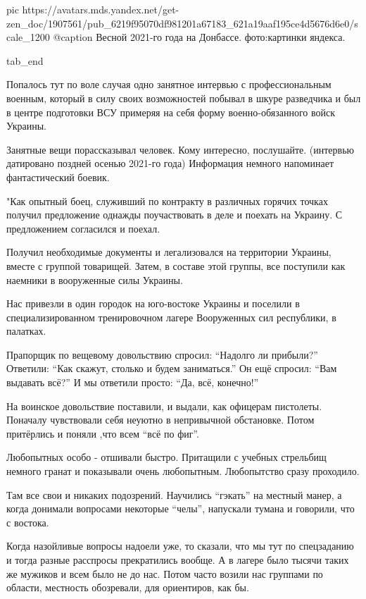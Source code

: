 		 pic https://avatars.mds.yandex.net/get-zen_doc/1907561/pub_6219f95070df981201a67183_621a19aaf195ce4d5676d6e0/scale_1200
		 @caption Весной 2021-го года на Донбассе. фото:картинки яндекса.

  tab_end
\fi

Попалось тут по воле случая одно занятное интервью с профессиональным военным,
который в силу своих возможностей побывал в шкуре разведчика и был в центре
подготовки ВСУ примеряя на себя форму военно-обязанного войск Украины.

Занятные вещи порассказывал человек. Кому интересно, послушайте. (интервью
датировано поздней осенью 2021-го года) Информация немного напоминает
фантастический боевик.

\begin{zznagolos}
"Как опытный боец, служивший по контракту в различных горячих точках получил
предложение однажды поучаствовать в деле и поехать на Украину. С предложением
согласился и поехал. 

Получил необходимые документы и легализовался на территории Украины, вместе
с группой товарищей. Затем, в составе этой группы, все поступили как
наемники в вооруженные силы Украины.	
\end{zznagolos}

Нас привезли в один городок на юго-востоке Украины и поселили в
специализированном тренировочном лагере Вооруженных сил республики, в палатках.

Прапорщик по вещевому довольствию спросил: \enquote{Надолго ли прибыли?}
Ответили: \enquote{Как скажут, столько и будем заниматься.} Он ещё спросил:
\enquote{Вам выдавать всё?} И мы ответили просто: \enquote{Да, всё, конечно!}

На воинское довольствие поставили, и выдали, как офицерам пистолеты. Поначалу
чувствовали себя неуютно в непривычной обстановке. Потом притёрлись и поняли
,что всем \enquote{всё по фиг}.

Любопытных особо - отшивали быстро. Притащили с учебных стрельбищ немного
гранат и показывали очень любопытным. Любопытство сразу проходило. 

\begin{zznagolos}
Там все свои и никаких подозрений. Научились \enquote{гэкать} на местный манер, а когда
донимали вопросами некоторые \enquote{челы}, напускали тумана и говорили, что с
востока.
\end{zznagolos}

Когда назойливые вопросы надоели уже, то сказали, что мы тут по спецзаданию и
тогда разные расспросы прекратились вообще. А в лагере было тысячи таких же
мужиков и всем было не до нас. Потом часто возили нас группами по области,
местность обозревали, для ориентиров, как бы.

